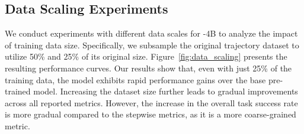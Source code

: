 

\subsection{Data Scaling Experiments} \label{sec:data_scaling}
We conduct experiments with different data scales for \model-4B to analyze the impact of training data size.
Specifically, we subsample the original trajectory dataset to utilize 50\% and 25\% of its original size.
Figure~\ref{fig:data_scaling} presents the resulting performance curves.
Our results show that, even with just 25\% of the training data, the model exhibits rapid performance gains over the base pre-trained model.
Increasing the dataset size further leads to gradual improvements across all reported metrics.
However, the increase in the overall task success rate is more gradual compared to the stepwise metrics, as it is a more coarse-grained metric.



